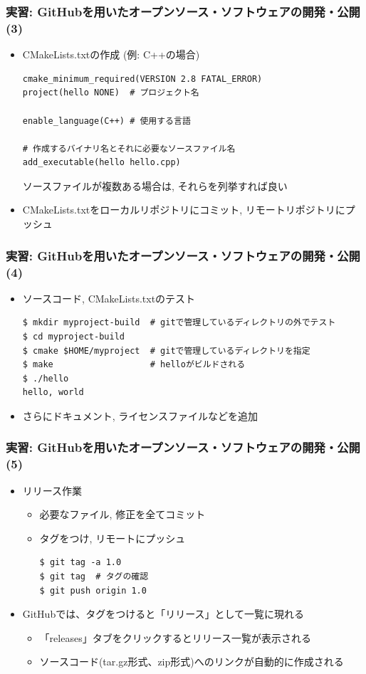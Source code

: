 \begin{frame}[t,fragile]
  \frametitle{実習: GitHubを用いたオープンソース・ソフトウェアの開発・公開(3)}
  \begin{itemize}
  \item CMakeLists.txtの作成 (例: C++の場合)
\begin{lstlisting}
cmake_minimum_required(VERSION 2.8 FATAL_ERROR)
project(hello NONE)  # プロジェクト名

enable_language(C++) # 使用する言語

# 作成するバイナリ名とそれに必要なソースファイル名
add_executable(hello hello.cpp)
\end{lstlisting}
  ソースファイルが複数ある場合は, それらを列挙すれば良い \\[0.5em]
  \item CMakeLists.txtをローカルリポジトリにコミット, リモートリポジトリにプッシュ
  \end{itemize}
\end{frame}

\begin{frame}[t,fragile]
  \frametitle{実習: GitHubを用いたオープンソース・ソフトウェアの開発・公開(4)}
  \begin{itemize}
  \item ソースコード, CMakeLists.txtのテスト
\begin{lstlisting}
$ mkdir myproject-build  # gitで管理しているディレクトリの外でテスト
$ cd myproject-build
$ cmake $HOME/myproject  # gitで管理しているディレクトリを指定
$ make                   # helloがビルドされる
$ ./hello
hello, world
\end{lstlisting}
  \item さらにドキュメント, ライセンスファイルなどを追加
  \end{itemize}
\end{frame}

\begin{frame}[t,fragile]
  \frametitle{実習: GitHubを用いたオープンソース・ソフトウェアの開発・公開(5)}
  \begin{itemize}
  \item リリース作業
    \begin{itemize}
    \item 必要なファイル, 修正を全てコミット
    \item タグをつけ, リモートにプッシュ
\begin{lstlisting}
$ git tag -a 1.0
$ git tag  # タグの確認
$ git push origin 1.0
\end{lstlisting}
    \end{itemize}
  \item GitHubでは、タグをつけると「リリース」として一覧に現れる
    \begin{itemize}
    \item 「releases」タブをクリックするとリリース一覧が表示される
    \item ソースコード(tar.gz形式、zip形式)へのリンクが自動的に作成される
    \end{itemize}
  \end{itemize}
\end{frame}

